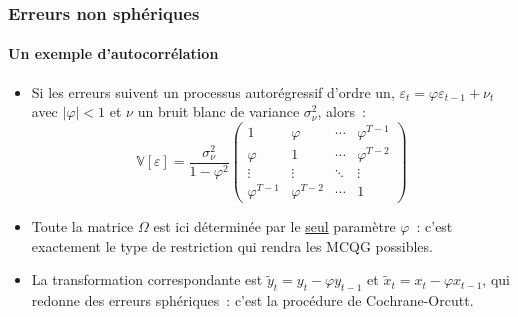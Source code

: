 \documentclass[10pt]{beamer}
\begin{document}
\begin{frame}
  \frametitle{Erreurs non sphériques}
  \framesubtitle{Un exemple d'autocorrélation}

  \begin{itemize}

  \item Si les erreurs suivent un processus autorégressif d'ordre un,
    $\varepsilon_t = \varphi\varepsilon_{t-1} + \nu_t$ avec $|\varphi|<1$ et $\nu$ un
    bruit blanc de variance $\sigma_{\nu}^2$, alors~:
    \[
      \mathbb V[\varepsilon] = \frac{\sigma_{\nu}^2}{1-\varphi^2}
      \begin{pmatrix}
        1          & \varphi    & \cdots & \varphi^{T-1}\\
        \varphi    & 1          & \cdots & \varphi^{T-2}\\
        \vdots     & \vdots     & \ddots & \vdots\\
        \varphi^{T-1} & \varphi^{T-2} & \cdots & 1
      \end{pmatrix}
    \]
    \medskip

  \item Toute la matrice $\Omega$ est ici déterminée par le \underline{seul} paramètre
    $\varphi$~: c'est exactement le type de restriction qui rendra les MCQG possibles.\newline

  \item[$\Rightarrow$] La transformation correspondante est
    $\tilde y_t = y_t - \varphi y_{t-1}$ et $\tilde x_t = x_t - \varphi x_{t-1}$, qui
    redonne des erreurs sphériques~: c'est la procédure de Cochrane-Orcutt.

  \end{itemize}

\end{frame}
\end{document}

